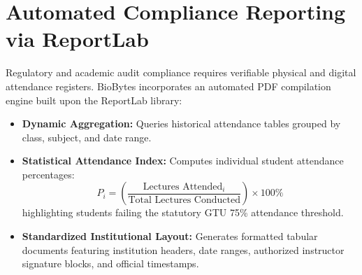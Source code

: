 \section{Automated Compliance Reporting via ReportLab}
Regulatory and academic audit compliance requires verifiable physical and digital attendance registers. BioBytes incorporates an automated PDF compilation engine built upon the ReportLab library:
\begin{itemize}
    \item \textbf{Dynamic Aggregation:} Queries historical attendance tables grouped by class, subject, and date range.
    \item \textbf{Statistical Attendance Index:} Computes individual student attendance percentages:
    \begin{equation}
    P_i = \left( \frac{\text{Lectures Attended}_i}{\text{Total Lectures Conducted}} \right) \times 100\%
    \end{equation}
    highlighting students failing the statutory GTU 75\% attendance threshold.
    \item \textbf{Standardized Institutional Layout:} Generates formatted tabular documents featuring institution headers, date ranges, authorized instructor signature blocks, and official timestamps.
\end{itemize}
